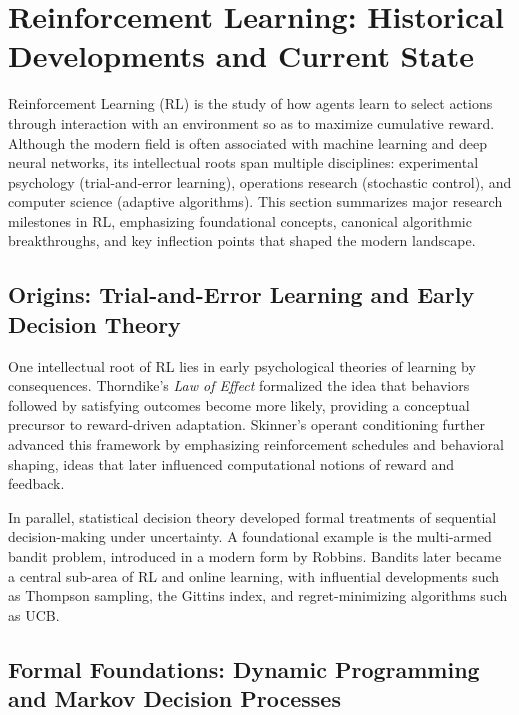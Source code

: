 \documentclass[sigconf]{acmart}
\begin{document}
\section{Reinforcement Learning: Historical Developments and Current State}
\label{sec:rl-history}

Reinforcement Learning (RL) is the study of how agents learn to select actions through interaction with an environment so as to maximize cumulative reward.
Although the modern field is often associated with machine learning and deep neural networks, its intellectual roots span multiple disciplines: experimental psychology (trial-and-error learning), operations research (stochastic control), and computer science (adaptive algorithms).
This section summarizes major research milestones in RL, emphasizing foundational concepts, canonical algorithmic breakthroughs, and key inflection points that shaped the modern landscape.

\subsection{Origins: Trial-and-Error Learning and Early Decision Theory}

One intellectual root of RL lies in early psychological theories of learning by consequences.
Thorndike's \emph{Law of Effect} formalized the idea that behaviors followed by satisfying outcomes become more likely, providing a conceptual precursor to reward-driven adaptation.\cite{thorndike1898animal}
Skinner's operant conditioning further advanced this framework by emphasizing reinforcement schedules and behavioral shaping, ideas that later influenced computational notions of reward and feedback.\cite{skinner1938behavior}

In parallel, statistical decision theory developed formal treatments of sequential decision-making under uncertainty.
A foundational example is the multi-armed bandit problem, introduced in a modern form by Robbins.\cite{robbins1952sequential}
Bandits later became a central sub-area of RL and online learning, with influential developments such as Thompson sampling,\cite{thompson1933likelihood}
the Gittins index,\cite{gittins1979bandit}
and regret-minimizing algorithms such as UCB.\cite{auer2002finite}

\subsection{Formal Foundations: Dynamic Programming and Markov Decision Processes}
\end{document}
